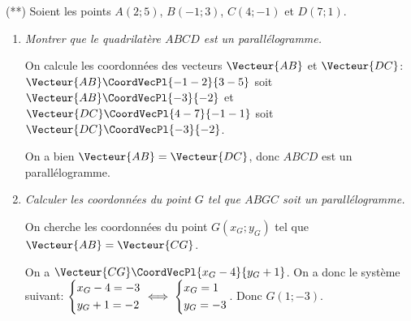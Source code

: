 \documentclass[a4paper]{article}
\begin{document}
\begin{exercice}{(**)}{}
 Soient les points $A(2;5)$, $B(-1;3)$, $C(4;-1)$ et $D(7;1)$.
 \begin{enumerate}
  \item \textit{Montrer que le quadrilatère $ABCD$ est un parallélogramme.}

  On calcule les coordonnées des vecteurs $\Vecteur{AB}$ et $\Vecteur{DC}$: $\Vecteur{AB}\CoordVecPl{-1-2}{3-5}$ soit $\Vecteur{AB}\CoordVecPl{-3}{-2}$ et $\Vecteur{DC}\CoordVecPl{4-7}{-1-1}$ soit $\Vecteur{DC}\CoordVecPl{-3}{-2}$.

  On a bien $\Vecteur{AB}=\Vecteur{DC}$, donc $ABCD$ est un parallélogramme.

  \item \textit{Calculer les coordonnées du point $G$ tel que $ABGC$ soit un parallélogramme.}
  
  On cherche les coordonnées du point $G(x_G;y_G)$ tel que $\Vecteur{AB}=\Vecteur{CG}$.

  On a $\Vecteur{CG}\CoordVecPl{x_G-4}{y_G+1}$. On a donc le système suivant:
  $\begin{dcases}
    x_G-4=-3\\
    y_G+1=-2
  \end{dcases} \iff \begin{dcases}
    x_G=1\\
    y_G=-3
  \end{dcases}$. Donc $G(1;-3)$.


 \end{enumerate}
\end{exercice}

\pagebreak
\end{document}
